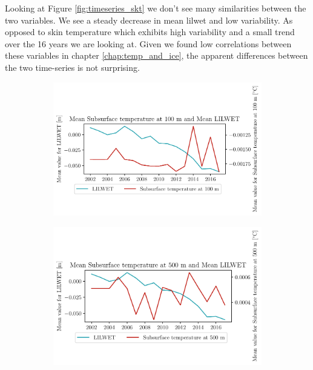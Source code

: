 \documentclass[../main.tex]{subfiles}
\begin{document}
Looking at Figure \ref{fig:timeseries_skt} we don't see many similarities between the two variables. We see a steady decrease in mean \gls{lilwet} and low variability. As opposed to skin temperature which exhibits high variability and a small trend  over the 16 years we are looking at. Given we found low correlations between these variables in chapter \ref{chap:temp_and_ice}, the apparent differences between the two time-series is not surprising. 

\begin{figure}[hbt!]
    \centering
    \begin{subfigure}[b]{0.45\textwidth}
    \includegraphics[width=\textwidth]{images/2021w5/chapter7/hres/tiemseries_subsurtemp_100_LIC}
    \end{subfigure}
    \begin{subfigure}[b]{0.45\textwidth}
    \includegraphics[width=\textwidth]{images/2021w5/chapter7/hres/tiemseries_subsurtemp_500_LIC}

\end{subfigure}
\end{figure}
\end{document}
